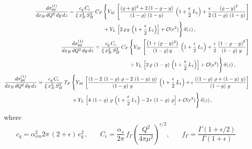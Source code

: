 \documentclass[superscriptaddress,showkeys,showpacs]{revtex4}
\begin{document}
\begin{align}
\begin{split}\label{eq:csqq}
\frac{d\sigma^{(1)}_{qq}}{dx_B\,dQ^2\,dy\,dz}=\frac{c_q\,C_{\epsilon}}
{\xi\,x_B^2\,S_H^2}\,
C_F\,&
\Bigg\{
Y_M\,
  \left[ 
    \frac{ (\varrho+y)^2+2\,(1-\varrho-y)}{\left(1 - \varrho \right) \,
\left( 1 - y \right) }\,
    \left( 
      1 + \frac{\epsilon}{2} \,L_1
    \right) 
    +\frac{\epsilon}{2}
    \frac{{\left( \varrho - y \right) }^2}
    {\left( 1 - \varrho \right) \,\left( 1 - y \right) }
  \right]
\\
&
  +  Y_L\,
  \left[
    2\,\varrho\,y\,\left( 1 + 
      \frac{\epsilon}{2} \,L_1
    \right)
  \right]+{\cal O}(\epsilon^2)
\Bigg\}\,\delta(z)\,,
\end{split}\\
\begin{split}\label{eq:csqg}
\frac{d\sigma^{(1)}_{qg}}{dx_B\,dQ^2\,dy\,dz}=\frac{c_q\,C_{\epsilon}}
{\xi\,x_B^2\,S_H^2}\,
C_F\,&
\Bigg\{
Y_M\,
  \left[
    \frac{\left( 1 + (\varrho-y)^2\right)}{(1 -\varrho)\,y}\,
    \left( 1 + \frac{\epsilon}{2}\,L_1 \right) +
    \frac{\epsilon}{2}\,
    \frac{{\left( 1 - \varrho - y \right) }^2}
    {\left(1 - \varrho \right) \,y}
  \right]
\\
&
  +  Y_L\,
  \left[2\,
    \varrho\,\left( 1 - y \right) \,\left( 1 + 
      \frac{\epsilon }{2}\,L_1 \right)
  \right]+{\cal O}(\epsilon^2)
\Bigg\}\,\delta(z)\,,
\end{split}\\
\begin{split}\label{eq:csgq}
\frac{d\sigma^{(1)}_{gq}}{dx_B\,dQ^2\,dy\,dz}=\frac{c_q\,C_{\epsilon}}
{\xi\,x_B^2\,S_H^2}\,
T_F\,&
\Bigg\{
Y_M\,
\left[
  \frac{\left( 1 - 2\,\left( 1 - \varrho \right) \,\varrho - 
       2\,\left( 1 - y \right) \,y \right)}{\left(1 - y \right) \,y}
   \,\left( 1 + \frac{\epsilon}{2}\,L_1 \right) +
  \epsilon\,\frac{\left( \left(1 - \varrho \right) \,\varrho + 
       \left( 1 - y \right) \,y \right)}{\left( 1 - y \right) \,y}
\right]
\\
&
  +  Y_L\,
  \left[
  4\,\left( 1 - \varrho \right) \,\varrho\,
  \left( 1 + \frac{\epsilon }{2}\,L_1 \right)
  - 2\,\epsilon\,\left( 1 - \varrho \right) \,\varrho
  \right]+{\cal O}(\epsilon^2)
\Bigg\}\,\delta(z)\,,
\end{split}
\end{align} 
where
\begin{equation}
c_q=\alpha_{em}^2 2\pi\,(2+\epsilon)\,e_q^2\,,\:\:\:\:\:\:\:\:C_{\epsilon}=
        \frac{\alpha_s}{2\pi}\,f_{\Gamma}
        \left(\frac{Q^2}{4\pi\mu^2}\right)^
        {\epsilon/2},\:\:\:\:\:\:\:\:f_{\Gamma}={
        \frac{\Gamma(1+\epsilon/2)}{\Gamma(1+\epsilon)}}\,
\end{equation}
\end{document}
